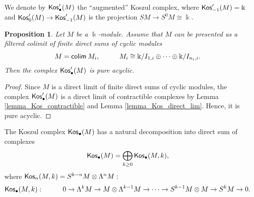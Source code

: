 \documentclass{amsart}
\numberwithin{equation}{section}
\newtheorem{proposition}[theorem]{Proposition}
\theoremstyle{definition}
\def\kk{\Bbbk}
\begin{document}
We denote by ${\sf Kos}'_\bullet(M)$ the  ``augmented'' Koszul complex, where ${\sf Kos}'_{-1}(M)=\kk$ and ${\sf Kos}'_{0}(M)\to {\sf Kos}'_{-1}(M)$ is the projection $SM\to S^0M\cong \kk.$


\begin{proposition}\label{prop_kos} Let  $M$ be a  $\kk$-module. Assume that 
$M$ can be presented as a filtered colimit of finite direct sums of cyclic modules
$$M={\sf colim}\:  M_i, \hspace{1cm} M_i\cong \kk/I_{1,i} \oplus \dots \oplus \kk/I_{n_i,i}.$$ Then the complex ${\sf Kos}'_\bullet(M)$ is pure acyclic. 
\end{proposition}
\begin{proof}
Since $M$ is a direct limit of finite direct sums of cyclic modules, the complex ${\sf Kos}'_\bullet(M)$ is a direct limit of contractible complexes by Lemma \ref{lemma_Kos_contractible} and Lemma \ref{lemma_Kos_direct_lim}. Hence, it is pure acyclic. 
\end{proof}

The Koszul complex ${\sf Kos}_\bullet(M)$ has a natural decomposition into direct sum of complexes
$${\sf Kos}_\bullet(M)=\bigoplus_{k\geq 0} {\sf Kos}_\bullet(M,k),$$
where ${\sf Kos}_n(M,k)= S^{k-n}M \otimes \Lambda^n M:$
$$ {\sf Kos}_\bullet(M,k): \hspace{1cm} 0 \to \Lambda^k M \to M\otimes \Lambda^{k-1}M \to  \dots  \to  S^{k-1}M\otimes M \to  S^kM\to 0.
$$
\end{document}
